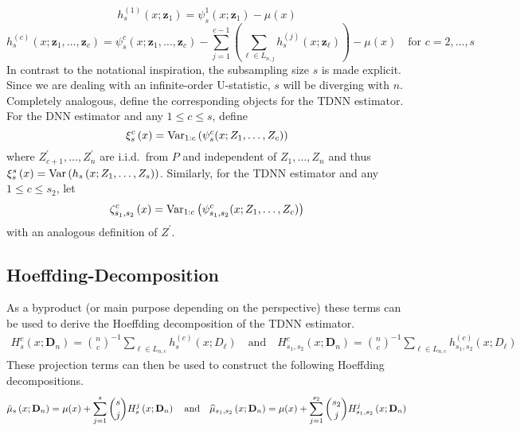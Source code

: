 \begin{equation}
	h_{s}^{(1)}\left(x; \mathbf{z}_{1}\right)
	= \psi_{s}^{1}(x; \mathbf{z}_{1}) - \mu(x)
\end{equation}
\begin{equation}
	h_{s}^{(c)}\left(x; \mathbf{z}_{1}, \dotsc, \mathbf{z}_{c}\right)
	= \psi_{s}^{c}(x; \mathbf{z}_{1}, \dotsc, \mathbf{z}_{c}) - \sum_{j = 1}^{c-1}\left(\sum_{\ell \in L_{n,j}}h_{s}^{(j)}(x; \mathbf{z}_{\ell})\right) - \mu(x)
	\quad \text{for } c = 2, \dotsc, s
\end{equation}
In contrast to the notational inspiration, the subsampling size $s$ is made explicit.
Since we are dealing with an infinite-order U-statistic, $s$ will be diverging with $n$.
Completely analogous, define the corresponding objects for the TDNN estimator.
For the DNN estimator and any $1 \leq c \leq s$, define
\begin{equation}\label{eq:xi_s_c}
	\xi_{s}^{c}\left(x\right)
	= \Var_{1:c}\left(\psi_{s}^{c}(x; Z_{1}, \dotsc, Z_{c})\right)
\end{equation}
where $Z_{c+1}^{\prime}, \ldots, Z_n^{\prime}$ are i.i.d.\ from $P$ and independent of $Z_1, \ldots, Z_n$ and thus
$\xi_{s}^{s}\left(x\right) = \Var\left(h_s\left(x; Z_1, \ldots, Z_s\right)\right)$.
Similarly, for the TDNN estimator and any $1 \leq c \leq s_2$, let
\begin{equation}\label{eq:zeta_s1s2_c}
	\zeta_{s_1, s_2}^{c}\left(x\right)
	= \Var_{1:c}\left(\psi_{s_1, s_2}^{c}(x; Z_{1}, \dotsc, Z_{c})\right)
\end{equation}
with an analogous definition of $Z^{\prime}$.

\subsection{Hoeffding-Decomposition}
As a byproduct (or main purpose depending on the perspective) these terms can be used to derive the Hoeffding decomposition of the TDNN estimator.
\begin{equation}\label{eq:H_projection}
	\begin{aligned}
		H_{s}^{c}\left(x; \mathbf{D}_n\right)
		= \binom{n}{c}^{-1} \sum_{\ell \in L_{n,c}} h^{(c)}_{s}(x; D_{\ell})
		\quad \text{and} \quad
		H_{s_1, s_2}^{c}\left(x; \mathbf{D}_n\right)
		= \binom{n}{c}^{-1} \sum_{\ell \in L_{n,c}} h^{(c)}_{s_1, s_2}(x; D_{\ell})
	\end{aligned}
\end{equation}
These projection terms can then be used to construct the following Hoeffding decompositions.
\begin{equation}\label{eq:H_Decomp}
	\tilde{\mu}_{s}\left(x; \mathbf{D}_n\right)
	= \mu(x) + \sum_{j = 1}^{s}\binom{s}{j}H_{s}^{j}\left(x; \mathbf{D}_n\right)\\
	\quad \text{and} \quad
	\hat{\mu}_{s_1, s_2}\left(x; \mathbf{D}_n\right)
	= \mu(x) + \sum_{j = 1}^{s_2}\binom{s_2}{j}H_{s_1, s_2}^{j}\left(x; \mathbf{D}_n\right)
\end{equation}

